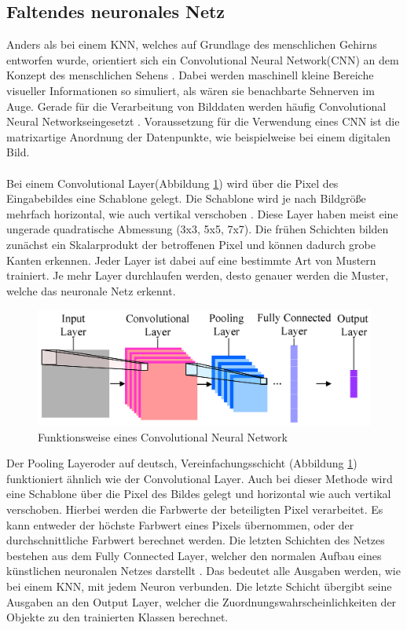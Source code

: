 \documentclass[a4paper,12pt,oneside]{article}
\begin{document}
  \subsection{Faltendes neuronales Netz}
Anders als bei einem KNN, welches auf Grundlage des menschlichen Gehirns entworfen wurde, orientiert sich ein \glqq Convolutional Neural Network\grqq (CNN) an dem Konzept des menschlichen Sehens \cite{lecun1989backpropagation}. Dabei werden maschinell kleine Bereiche visueller Informationen so simuliert, als wären sie benachbarte Sehnerven im Auge. Gerade für die Verarbeitung von Bilddaten werden häufig \glqq Convolutional Neural Networks\grqq eingesetzt \cite[326]{goodfellow2016deep}. Voraussetzung für die Verwendung eines CNN ist die matrixartige Anordnung der Datenpunkte, wie beispielweise bei einem digitalen Bild.
\\
\\
Bei einem \glqq Convolutional Layer\grqq (Abbildung \ref{img:CNN}) wird über die Pixel des Eingabebildes eine Schablone gelegt. Die Schablone wird je nach Bildgröße mehrfach horizontal, wie auch vertikal verschoben \cite[327-335]{goodfellow2016deep}. Diese Layer haben meist eine ungerade quadratische Abmessung (3x3, 5x5, 7x7). Die frühen Schichten bilden zunächst ein Skalarprodukt der betroffenen Pixel und können dadurch grobe Kanten erkennen. Jeder Layer ist dabei auf eine bestimmte Art von Mustern trainiert. Je mehr Layer durchlaufen werden, desto genauer werden die Muster, welche das neuronale Netz erkennt.

\begin{figure}
    [h]
	\centering
	\includegraphics[scale=1.5]{Sources/cnn2.png}
		\caption{Funktionsweise eines Convolutional Neural Network\cite{info7040061}}
	\label{img:CNN}
\end{figure}

Der \glqq Pooling Layer\grqq oder auf deutsch, Vereinfachungsschicht (Abbildung \ref{img:CNN}) funktioniert ähnlich wie der \glqq Convolutional Layer\grqq \cite[336f.]{goodfellow2016deep}. Auch bei dieser Methode wird eine Schablone über die Pixel des Bildes gelegt und horizontal wie auch vertikal verschoben. Hierbei werden die Farbwerte der beteiligten Pixel verarbeitet. Es kann entweder der höchste Farbwert eines Pixels übernommen, oder der durchschnittliche Farbwert berechnet werden. Die letzten Schichten des Netzes bestehen aus dem \glqq Fully Connected Layer\grqq, welcher den normalen Aufbau eines künstlichen neuronalen Netzes darstellt \cite[14]{lecun1989backpropagation}. Das bedeutet alle Ausgaben werden, wie bei einem KNN, mit jedem Neuron verbunden. Die letzte Schicht übergibt seine Ausgaben an den Output Layer, welcher die Zuordnungswahrscheinlichkeiten der Objekte zu den trainierten Klassen berechnet.
\end{document}
